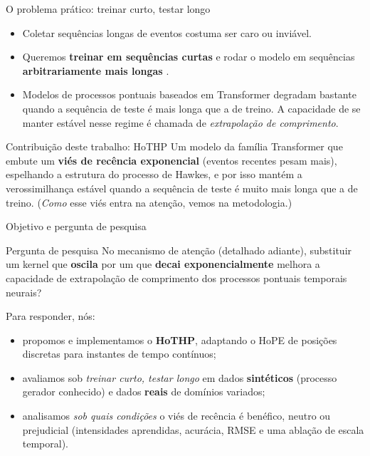 \documentclass[aspectratio=169,9pt]{beamer}
\begin{document}
\begin{frame}{O problema prático: treinar curto, testar longo}
  \begin{itemize}
    \item Coletar sequências longas de eventos costuma ser caro ou inviável.
    \item Queremos \textbf{treinar em sequências curtas} e rodar o modelo em
          sequências \textbf{arbitrariamente mais longas} \cite{press2022train}.
    \item Modelos de processos pontuais baseados em Transformer degradam bastante
          quando a sequência de teste é mais longa que a de treino. A capacidade
          de se manter estável nesse regime é chamada de
          \emph{extrapolação de comprimento}.
  \end{itemize}
  \vspace{0.6em}
  \begin{block}{Contribuição deste trabalho: HoTHP}
    Um modelo da família Transformer que embute um \textbf{viés de recência
    exponencial} (eventos recentes pesam mais), espelhando a estrutura do
    processo de Hawkes, e por isso mantém a verossimilhança estável quando a
    sequência de teste é muito mais longa que a de treino.
    {\small (\emph{Como} esse viés entra na atenção, vemos na metodologia.)}
  \end{block}
\end{frame}

\begin{frame}{Objetivo e pergunta de pesquisa}
  \begin{block}{Pergunta de pesquisa}
    No mecanismo de atenção (detalhado adiante), substituir um kernel que
    \textbf{oscila} por um que \textbf{decai exponencialmente} melhora a capacidade de extrapolação de comprimento dos
    processos pontuais temporais neurais?
  \end{block}
  \vspace{0.5em}
  Para responder, nós:
  \begin{itemize}
    \item propomos e implementamos o \textbf{HoTHP}, adaptando o HoPE de posições
          discretas para instantes de tempo contínuos;
    \item avaliamos sob \emph{treinar curto, testar longo} em dados
          \textbf{sintéticos} (processo gerador conhecido) e dados \textbf{reais}
          de domínios variados;
    \item analisamos \emph{sob quais condições} o viés de recência é benéfico,
          neutro ou prejudicial (intensidades aprendidas, acurácia, RMSE e uma
          ablação de escala temporal).
  \end{itemize}
\end{frame}
\end{document}
